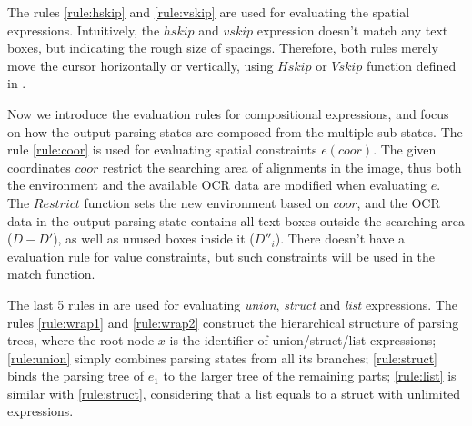The rules \ref{rule:hskip} and \ref{rule:vskip}
are used for evaluating the spatial expressions.
Intuitively, the $hskip$ and $vskip$ expression doesn't match any text boxes,
but indicating the rough size of spacings.
Therefore, both rules merely move the cursor horizontally or vertically,
using $Hskip$ or $Vskip$ function defined in .

Now we introduce the evaluation rules for compositional expressions,
and focus on how the output parsing states are composed from
the multiple sub-states.
The rule \ref{rule:coor} is used for evaluating spatial constraints $e(coor)$.
The given coordinates $coor$ restrict the searching area of alignments
in the image, thus both the environment and the available OCR data are modified
when evaluating $e$.
The $Restrict$ function sets the new environment based on $coor$,
and the OCR data in the output parsing state contains
all text boxes outside the searching area ($D-D'$),
as well as unused boxes inside it ($D''_i$).
There doesn't have a evaluation rule for value constraints,
but such constraints will be used in the match function.

The last 5 rules in  are used for evaluating
\textit{union}, \textit{struct} and \textit{list} expressions.
The rules \ref{rule:wrap1} and \ref{rule:wrap2}
construct the hierarchical structure of parsing trees,
where the root node $x$ is the identifier of union/struct/list expressions;
\ref{rule:union} simply combines parsing states from all its branches;
\ref{rule:struct} binds the parsing tree of $e_1$ to the larger tree of
the remaining parts;
\ref{rule:list} is similar with \ref{rule:struct}, considering that
a list equals to a struct with unlimited expressions.





